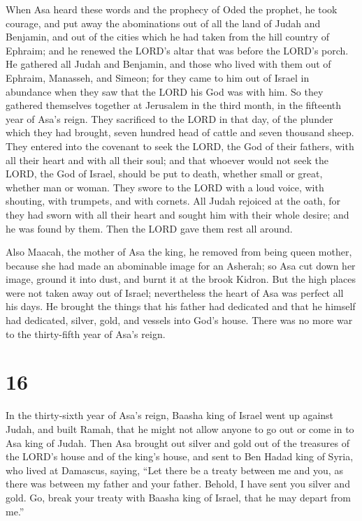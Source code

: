  When Asa heard these words and the prophecy of Oded the
prophet, he took courage, and put away the abominations out of all the
land of Judah and Benjamin, and out of the cities which he had taken
from the hill country of Ephraim; and he renewed the LORD's altar that
was before the LORD's porch.  He gathered all Judah and
Benjamin, and those who lived with them out of Ephraim, Manasseh, and
Simeon; for they came to him out of Israel in abundance when they saw
that the LORD his God was with him.  So they gathered
themselves together at Jerusalem in the third month, in the fifteenth
year of Asa's reign.  They sacrificed to the LORD in that
day, of the plunder which they had brought, seven hundred head of cattle
and seven thousand sheep.  They entered into the covenant
to seek the LORD, the God of their fathers, with all their heart and
with all their soul;  and that whoever would not seek the
LORD, the God of Israel, should be put to death, whether small or great,
whether man or woman.  They swore to the LORD with a loud
voice, with shouting, with trumpets, and with cornets. 
All Judah rejoiced at the oath, for they had sworn with all their heart
and sought him with their whole desire; and he was found by them. Then
the LORD gave them rest all around.

 Also Maacah, the mother of Asa the king, he removed from
being queen mother, because she had made an abominable image for an
Asherah; so Asa cut down her image, ground it into dust, and burnt it at
the brook Kidron.  But the high places were not taken
away out of Israel; nevertheless the heart of Asa was perfect all his
days.  He brought the things that his father had
dedicated and that he himself had dedicated, silver, gold, and vessels
into God's house.  There was no more war to the
thirty-fifth year of Asa's reign.

\hypertarget{section-15}{%
\section{16}\label{section-15}}

 In the thirty-sixth year of Asa's reign, Baasha king of
Israel went up against Judah, and built Ramah, that he might not allow
anyone to go out or come in to Asa king of Judah.  Then
Asa brought out silver and gold out of the treasures of the LORD's house
and of the king's house, and sent to Ben Hadad king of Syria, who lived
at Damascus, saying,  ``Let there be a treaty between me
and you, as there was between my father and your father. Behold, I have
sent you silver and gold. Go, break your treaty with Baasha king of
Israel, that he may depart from me.''

